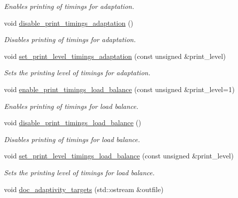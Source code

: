 \begin{DoxyCompactItemize}
\begin{DoxyCompactList}\small\item\em Enables printing of timings for adaptation. \end{DoxyCompactList}\item 
void \hyperlink{classoomph_1_1RefineableTriangleMesh_aa4c245df63f0fe2feb82bf2bf05e65ef}{disable\+\_\+print\+\_\+timings\+\_\+adaptation} ()
\begin{DoxyCompactList}\small\item\em Disables printing of timings for adaptation. \end{DoxyCompactList}\item 
void \hyperlink{classoomph_1_1RefineableTriangleMesh_a3580283bfa7acd135e294051890c62a4}{set\+\_\+print\+\_\+level\+\_\+timings\+\_\+adaptation} (const unsigned \&print\+\_\+level)
\begin{DoxyCompactList}\small\item\em Sets the printing level of timings for adaptation. \end{DoxyCompactList}\item 
void \hyperlink{classoomph_1_1RefineableTriangleMesh_a262467b16b4d2749230e9ace5649b8cf}{enable\+\_\+print\+\_\+timings\+\_\+load\+\_\+balance} (const unsigned \&print\+\_\+level=1)
\begin{DoxyCompactList}\small\item\em Enables printing of timings for load balance. \end{DoxyCompactList}\item 
void \hyperlink{classoomph_1_1RefineableTriangleMesh_a380e00a99cdcbdf262e1ebfc1af30007}{disable\+\_\+print\+\_\+timings\+\_\+load\+\_\+balance} ()
\begin{DoxyCompactList}\small\item\em Disables printing of timings for load balance. \end{DoxyCompactList}\item 
void \hyperlink{classoomph_1_1RefineableTriangleMesh_a1bde786a756e1a076df48fe11b8640f9}{set\+\_\+print\+\_\+level\+\_\+timings\+\_\+load\+\_\+balance} (const unsigned \&print\+\_\+level)
\begin{DoxyCompactList}\small\item\em Sets the printing level of timings for load balance. \end{DoxyCompactList}\item 
void \hyperlink{classoomph_1_1RefineableTriangleMesh_a8b04c27cba8938936f73d90e00d70b22}{doc\+\_\+adaptivity\+\_\+targets} (std\+::ostream \&outfile)

\end{DoxyCompactItemize}
